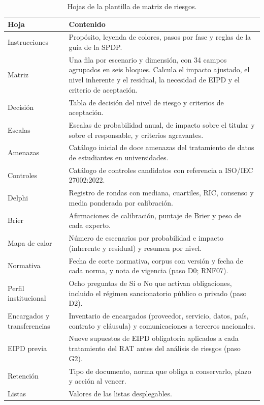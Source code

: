 \begin{table}[htbp]
  \centering
  \caption{Hojas de la plantilla de matriz de riesgos.}
  \label{tab:hojas_plantilla}
  \footnotesize
  \renewcommand{\arraystretch}{1.25}
  \begin{tabularx}{\textwidth}{|p{2.6cm}|L|}
    \hline
    \textbf{Hoja} & \textbf{Contenido} \\
    \hline
    Instrucciones & Propósito, leyenda de colores, pasos por fase y reglas de la guía de la SPDP. \\
    \hline
    Matriz & Una fila por escenario y dimensión, con 34 campos agrupados en seis bloques. Calcula el impacto ajustado, el nivel inherente y el residual, la necesidad de EIPD y el criterio de aceptación. \\
    \hline
    Decisión & Tabla de decisión del nivel de riesgo y criterios de aceptación. \\
    \hline
    Escalas & Escalas de probabilidad anual, de impacto sobre el titular y sobre el responsable, y criterios agravantes. \\
    \hline
    Amenazas & Catálogo inicial de doce amenazas del tratamiento de datos de estudiantes en universidades. \\
    \hline
    Controles & Catálogo de controles candidatos con referencia a ISO/IEC 27002:2022. \\
    \hline
    Delphi & Registro de rondas con mediana, cuartiles, RIC, consenso y media ponderada por calibración. \\
    \hline
    Brier & Afirmaciones de calibración, puntaje de Brier y peso de cada experto. \\
    \hline
    Mapa de calor & Número de escenarios por probabilidad e impacto (inherente y residual) y resumen por nivel. \\
    \hline
    Normativa & Fecha de corte normativa, corpus con versión y fecha de cada norma, y nota de vigencia (paso D0; RNF07). \\
    \hline
    Perfil institucional & Ocho preguntas de Sí o No que activan obligaciones, incluido el régimen sancionatorio público o privado (paso D2). \\
    \hline
    Encargados y transferencias & Inventario de encargados (proveedor, servicio, datos, país, contrato y cláusula) y comunicaciones a terceros nacionales. \\
    \hline
    EIPD previa & Nueve supuestos de EIPD obligatoria aplicados a cada tratamiento del RAT antes del análisis de riesgos (paso G2). \\
    \hline
    Retención & Tipo de documento, norma que obliga a conservarlo, plazo y acción al vencer. \\
    \hline
    Listas & Valores de las listas desplegables. \\
    \hline
  \end{tabularx}
  \raggedright
\end{table}


